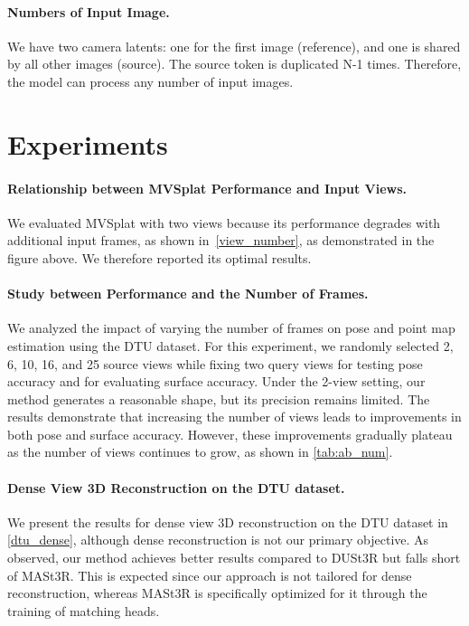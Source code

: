 \paragraph{Numbers of Input Image.}
We have two camera latents: one for the first image (reference), and one is shared by all other images (source). The source token is duplicated N-1 times. Therefore, the model can process any number of input images.



\section{Experiments}

\paragraph{Relationship between MVSplat Performance and Input Views.}
We evaluated MVSplat with two views because its
performance degrades with additional input frames, as shown in~\cref{view_number}, as
demonstrated in the figure above. We therefore reported
its optimal results.





\paragraph{Study between Performance and the Number of Frames.}
We analyzed the impact of varying the number of frames on pose and point map estimation using the DTU dataset.  
For this experiment, we randomly selected 2, 6, 10, 16, and 25 source views while fixing two query views for testing pose accuracy and for evaluating surface accuracy. Under the 2-view setting, our method generates a reasonable shape, but its precision remains limited. The results demonstrate that increasing the number of views leads to improvements in both pose and surface accuracy. However, these improvements gradually plateau as the number of views continues to grow, as shown in \cref{tab:ab_num}.





\paragraph{Dense View 3D Reconstruction on the DTU dataset.}
% 
We present the results for dense view 3D reconstruction on the DTU dataset in \cref{dtu_dense}, although dense reconstruction is not our primary objective.
% 
% 
As observed, our method achieves better results compared to DUSt3R but falls short of MASt3R. 
% 
This is expected since our approach is not tailored for dense reconstruction, whereas MASt3R is specifically optimized for it through the training of matching heads.  


